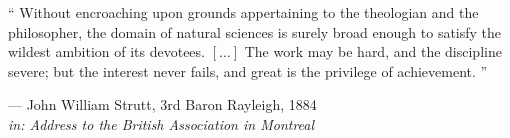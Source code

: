 \documentclass[
	10pt,
	twoside,
	chapterinoneline,
	onehalfspacing, %
	nolistspacing, %
	parskip, %
	headsepline, %
	english,
]{MastersDoctoralThesis} %
\begin{document}
%
	\vspace*{0.33\textheight}
	\noindent\enquote{%
		Without encroaching upon grounds appertaining to the theologian and the
		philosopher, the domain of natural sciences is surely broad enough to
		satisfy the wildest ambition of its devotees. $\left[\dots\right]$
		The work may be hard, and the discipline severe; but the interest never
		fails, and great is the privilege of achievement.
	}\bigbreak%
	\begin{flushright}
		--- John William Strutt, 3rd Baron Rayleigh, 1884\\
		\small\emph{in: Address to the British Association in Montreal}
	\end{flushright}
%
\end{document}

